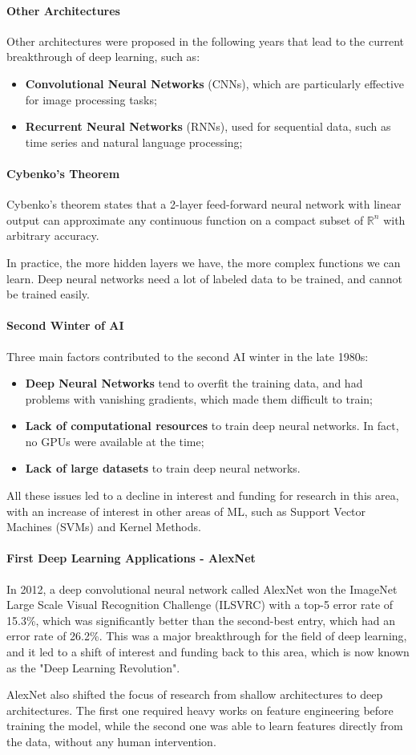 \paragraph{Other Architectures}
Other architectures were proposed in the following years that lead to the current breakthrough of deep learning, such as:
\begin{itemize}
    \item \textbf{Convolutional Neural Networks} (CNNs), which are particularly effective for image processing tasks;
    \item \textbf{Recurrent Neural Networks} (RNNs), used for sequential data, such as time series and natural language processing;
\end{itemize}

\paragraph{Cybenko's Theorem}
Cybenko's theorem states that a 2-layer feed-forward neural network with linear output
can approximate any continuous function on a compact subset of $\mathbb{R}^n$ with arbitrary accuracy.

In practice, the more hidden layers we have, the more complex functions we can learn. Deep
neural networks need a lot of labeled data to be trained, and cannot be trained easily.

\paragraph{Second Winter of AI}
Three main factors contributed to the second AI winter in the late 1980s:
\begin{itemize}
    \item \textbf{Deep Neural Networks} tend to overfit the training data, and had problems
    with vanishing gradients, which made them difficult to train;
    \item \textbf{Lack of computational resources} to train deep neural networks. In fact, no GPUs were available at the time;
    \item \textbf{Lack of large datasets} to train deep neural networks.
\end{itemize}
All these issues led to a decline in interest and funding for research in this area, with an increase
of interest in other areas of ML, such as Support Vector Machines (SVMs) and Kernel Methods.

\paragraph{First Deep Learning Applications - AlexNet}
In 2012, a deep convolutional neural network called AlexNet won the ImageNet Large Scale Visual Recognition Challenge (ILSVRC) with a top-5 error rate of 15.3\%, 
which was significantly better than the second-best entry, which had an error rate of 26.2\%.
This was a major breakthrough for the field of deep learning, and it led to a shift of interest and funding back to this area, which is now known as the "Deep Learning Revolution".

AlexNet also shifted the focus of research from shallow architectures to deep architectures. The first one
required heavy works on feature engineering before training the model, while the second one was able to learn features directly from the data, without any human intervention.